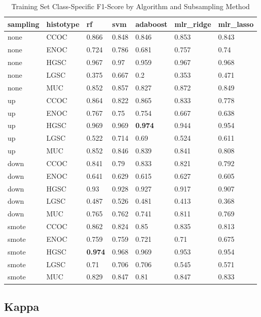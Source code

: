 \documentclass[
]{report}
\begin{document}
\begin{table}

\caption{\label{tab:train-f1-class-table}Training Set Class-Specific F1-Score by Algorithm and Subsampling Method}
\centering
\begin{tabular}[t]{l|l|l|l|l|l|l}
\hline
sampling & histotype & rf & svm & adaboost & mlr\_ridge & mlr\_lasso\\
\hline
none & CCOC & 0.866 & 0.848 & 0.846 & 0.853 & 0.843\\
\hline
none & ENOC & 0.724 & 0.786 & 0.681 & 0.757 & 0.74\\
\hline
none & HGSC & 0.967 & 0.97 & 0.959 & 0.967 & 0.968\\
\hline
none & LGSC & 0.375 & 0.667 & 0.2 & 0.353 & 0.471\\
\hline
none & MUC & 0.852 & 0.857 & 0.827 & 0.872 & 0.849\\
\hline
up & CCOC & 0.864 & 0.822 & 0.865 & 0.833 & 0.778\\
\hline
up & ENOC & 0.767 & 0.75 & 0.754 & 0.667 & 0.638\\
\hline
up & HGSC & 0.969 & 0.969 & \textbf{0.974} & 0.944 & 0.954\\
\hline
up & LGSC & 0.522 & 0.714 & 0.69 & 0.524 & 0.611\\
\hline
up & MUC & 0.852 & 0.846 & 0.839 & 0.841 & 0.808\\
\hline
down & CCOC & 0.841 & 0.79 & 0.833 & 0.821 & 0.792\\
\hline
down & ENOC & 0.641 & 0.629 & 0.615 & 0.627 & 0.605\\
\hline
down & HGSC & 0.93 & 0.928 & 0.927 & 0.917 & 0.907\\
\hline
down & LGSC & 0.487 & 0.526 & 0.481 & 0.413 & 0.368\\
\hline
down & MUC & 0.765 & 0.762 & 0.741 & 0.811 & 0.769\\
\hline
smote & CCOC & 0.862 & 0.824 & 0.85 & 0.835 & 0.813\\
\hline
smote & ENOC & 0.759 & 0.759 & 0.721 & 0.71 & 0.675\\
\hline
smote & HGSC & \textbf{0.974} & 0.968 & 0.969 & 0.953 & 0.954\\
\hline
smote & LGSC & 0.71 & 0.706 & 0.706 & 0.545 & 0.571\\
\hline
smote & MUC & 0.829 & 0.847 & 0.81 & 0.847 & 0.833\\
\hline
\end{tabular}
\end{table}

\hypertarget{kappa}{%
\subsection{Kappa}\label{kappa}}
\end{document}

